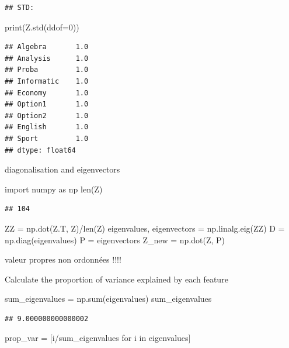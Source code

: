 \documentclass[
  10pt,
]{article}
\newenvironment{Shaded}{\begin{snugshade}}{\end{snugshade}}
\newcommand{\NormalTok}[1]{#1}
\begin{document}
\begin{verbatim}
## STD:
\end{verbatim}

\begin{Shaded}
\begin{Highlighting}[]
\NormalTok{print(Z.std(ddof=0))}
\end{Highlighting}
\end{Shaded}

\begin{verbatim}
## Algebra       1.0
## Analysis      1.0
## Proba         1.0
## Informatic    1.0
## Economy       1.0
## Option1       1.0
## Option2       1.0
## English       1.0
## Sport         1.0
## dtype: float64
\end{verbatim}

diagonalisation and eigenvectors

\begin{Shaded}
\begin{Highlighting}[]
\NormalTok{import numpy as np}
\NormalTok{len(Z)}
\end{Highlighting}
\end{Shaded}

\begin{verbatim}
## 104
\end{verbatim}

\begin{Shaded}
\begin{Highlighting}[]
\NormalTok{ZZ = np.dot(Z.T, Z)/len(Z)}
\NormalTok{eigenvalues, eigenvectors = np.linalg.eig(ZZ)}
\NormalTok{D = np.diag(eigenvalues)}
\NormalTok{P = eigenvectors}
\NormalTok{Z\_new = np.dot(Z, P)}
\end{Highlighting}
\end{Shaded}

valeur propres non ordonnées !!!!

Calculate the proportion of variance explained by each feature

\begin{Shaded}
\begin{Highlighting}[]
\NormalTok{sum\_eigenvalues = np.sum(eigenvalues)}
\NormalTok{sum\_eigenvalues}
\end{Highlighting}
\end{Shaded}

\begin{verbatim}
## 9.000000000000002
\end{verbatim}

\begin{Shaded}
\begin{Highlighting}[]
\NormalTok{prop\_var = [i/sum\_eigenvalues for i in eigenvalues]}
\end{Highlighting}
\end{Shaded}
\end{document}
